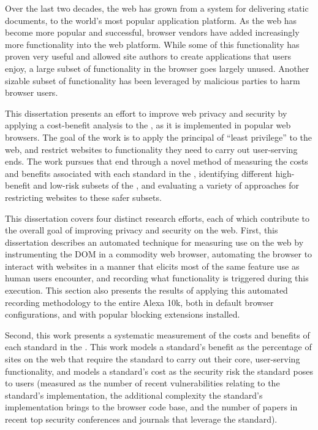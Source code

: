 \summary
Over the last two decades, the web has grown from a system for delivering
static documents, to the world's most popular application platform.  As the
web has become more popular and successful, browser vendors have added
increasingly more functionality into the web platform.
While some of this functionality has proven very useful and allowed site
authors to create applications that users enjoy, a large subset of functionality
in the browser goes largely unused.  Another sizable subset of functionality
has been leveraged by malicious parties to harm browser users.

This dissertation presents an effort to improve web privacy and security
by applying a cost-benefit analysis to the \WAPI, as it is implemented in
popular web browsers.  The goal of the work is to apply the principal of
``least privilege'' to the web, and restrict websites to functionality
they need to carry out user-serving ends.  The work pursues that
end through a novel method of measuring the costs and benefits associated with
each standard in the \WAPI, identifying different high-benefit and low-risk
subsets of the \WAPI, and evaluating a variety of approaches for
restricting websites to these safer subsets.

This dissertation covers four distinct research efforts, each of which contribute
to the overall goal of improving privacy and security on the web.  First,
this dissertation describes an automated technique for measuring \WAPI use on the web by
instrumenting the DOM in a commodity web browser, automating the browser
to interact with websites in a manner that elicits most of the same
feature use as human users encounter, and recording what functionality is
triggered during this execution.  This section also presents the results of
applying this automated recording methodology to the entire Alexa 10k, both
in default browser configurations, and with popular blocking extensions installed.

Second, this work presents a systematic measurement of the costs and benefits of
each standard in the \WAPI.  This work models a standard's benefit
as the percentage of sites on the web that require the standard to carry out
their core, user-serving functionality, and models a standard's cost as
the security risk the standard poses to users (measured as the number of
recent vulnerabilities relating to the standard's implementation, the additional
complexity the standard's implementation brings to the browser code base, and
the number of papers in recent top security conferences and journals that
leverage the standard).

